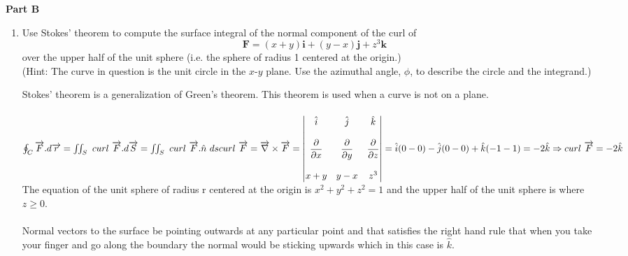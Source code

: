 \documentclass[fleqn]{article}
\begin{document}
  \pagebreak

  \textbf{Part B}
  \begin{enumerate}
    \item Use Stokes' theorem to compute the surface integral of the normal component of the curl of
    $$
    \mathbf{F}= (x+y) \mathbf{i} + (y -x) \mathbf{j} + z^3 \mathbf{k}
    $$
    over the upper half of the unit sphere (i.e. the sphere of radius 1 centered at the origin.) \\
    (Hint: The curve in question is the unit circle in the $x$-$y$ plane. Use the azimuthal angle, $\phi$, to describe the circle and the integrand.)

      \textcolor{hwColor}{
        Stokes' theorem is a generalization of Green's theorem. This theorem is used when a curve is not on a plane.  \\
        \\
        $
          \oint_C \overrightarrow{F}.d\overrightarrow{r}=\iint_S ~ curl ~ \overrightarrow{F}.d\overrightarrow{S}=\iint_S ~ curl ~ \overrightarrow{F}.\hat{n} ~ ds \\
          \\
          curl ~ \overrightarrow{F}=\overrightarrow{\nabla} \times \overrightarrow{F}=\begin{vmatrix}
            \hat{i} & \hat{j} & \hat{k} \\
            \\
            \dfrac{\partial}{\partial x} & \dfrac{\partial}{\partial y} & \dfrac{\partial}{\partial z} \\
            \\
            x+y & y-x & z^3 
          \end{vmatrix}=\hat{i}(0-0)-\hat{j}(0-0)+\hat{k}(-1-1)=-2\hat{k} \\
          \\
          \\
          \Rightarrow curl ~ \overrightarrow{F}=-2\hat{k} \\ \\
        $
        The equation of the unit sphere of radius r centered at the origin is $x^2+y^2+z^2=1$ and the upper half of the unit sphere is
        where $z\geq 0$. \\
        \\
        Normal vectors to the surface be pointing outwards at any particular point and that satisfies the right hand rule that
        when you take your finger and go along the boundary the normal would be sticking upwards which in this case is $\hat{k}$. \\ \\  
}
\end{enumerate}
\end{document}
